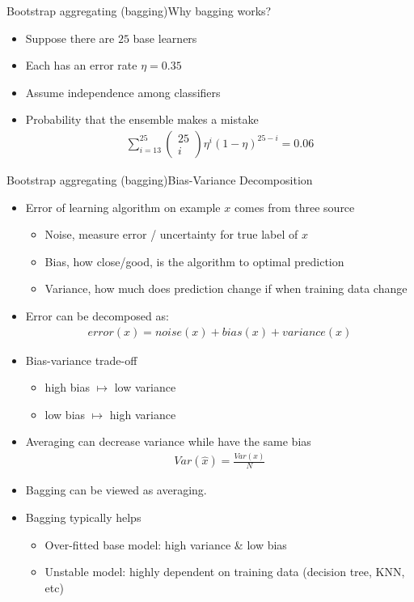 \documentclass[first=dgreen,second=purple,logo=yellowexc]{aaltoslides}
\begin{document}
\begin{frame}{Bootstrap aggregating (bagging)}{Why bagging works?}
\begin{itemize}
    \item Suppose there are $25$ base learners
    \item Each has an error rate $\eta=0.35$ 
    \item Assume independence among classifiers
    \item Probability that the ensemble makes a mistake 
    \begin{align*}
        \sum_{i=13}^{25}\left(\begin{array}{c} 25\\i\end{array}\right)\eta^i(1-\eta)^{25-i}=0.06
    \end{align*}
\end{itemize}
\end{frame}


\begin{frame}[allowframebreaks]{Bootstrap aggregating (bagging)}{Bias-Variance Decomposition}
\begin{itemize}
    \item Error of learning algorithm on example $x$ comes from three source
    \begin{itemize}
        \item Noise, measure error / uncertainty for true label of $x$
        \item Bias, how close/good, is the algorithm to optimal prediction
        \item Variance, how much does prediction change if when training data change
    \end{itemize}
    \item Error can be decomposed as:
        \begin{align*}
            error(x)=noise(x)+bias(x)+variance(x)
        \end{align*}
    \item Bias-variance trade-off
    \begin{itemize}
        \item high bias $\mapsto$ low variance
        \item low bias $\mapsto$ high variance
    \end{itemize}
    \item Averaging can decrease variance while have the same bias
    \begin{align*}
    Var(\hat{x}) = \frac{Var(x)}{N}
    \end{align*}
    \item Bagging can be viewed as averaging.
    \item Bagging typically helps
    \begin{itemize}
        \item Over-fitted base model: high variance \& low bias
        \item Unstable model: highly dependent on training data (decision tree, KNN, etc)
    \end{itemize}
\end{itemize}
\end{frame}
\end{document}
